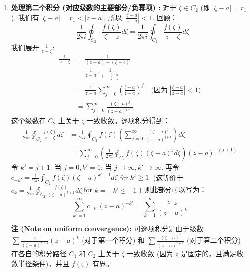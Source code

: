\documentclass[linespread=1.5,openany]{book}%
\def\diff{d}%
\theoremstyle{plain}
\newcommand{\diff}{\mathop{}\!\mathrm{d}}  %
\begin{document}
{{{{{{{{\begin{enumerate}[label=\arabic*)]
											\textbf {注:}可逐项积分是由于级数$\sum_{k=0}^{\infty} \frac{(z-a)^k}{(\zeta-a)^{k+1}}$在 $C_1$ 上关于参数$z$一致收敛.
											
											又 \(f(\zeta)\) 在 $C_1$ 上有界，则$\sum_{k=0}^{\infty} \frac{f(\zeta)(z-a)^k}{(\zeta-a)^{k+1}}$在 $C_1$ 上一致收敛.
											
											
											\item \textbf{处理第二个积分 (对应级数的主要部分/负幂项) :}
											对于 $\zeta \in C_2$ (即 $|\zeta-a|=r_1$), 我们有 $|\zeta-a| = r_1 < |z-a|$.
											所以 $\left|\frac{\zeta-a}{z-a}\right| < 1$.
											回顾：
											\[ -\frac{1}{2\pi i} \oint_{C_2} \frac{f(\zeta)}{\zeta-z} \diff \zeta = \frac{1}{2\pi i} \oint_{C_2} \frac{f(\zeta)}{z-\zeta} \diff \zeta \]
											我们展开 $\frac{1}{z-\zeta}$:
											\begin{align*}
												\frac{1}{z-\zeta} &= \frac{1}{(z-a) - (\zeta-a)} \\
												&= \frac{1}{z-a} \cdot \frac{1}{1 - \frac{\zeta-a}{z-a}} \\
												&= \frac{1}{z-a} \sum_{j=0}^{\infty} \left(\frac{\zeta-a}{z-a}\right)^j \quad \text{(因为 } \left|\frac{\zeta-a}{z-a}\right|<1 \text{)} \\
												&= \sum_{j=0}^{\infty} \frac{(\zeta-a)^j}{(z-a)^{j+1}}
											\end{align*}
											这个级数在 $C_2$ 上关于 $\zeta$ 一致收敛。逐项积分得到：
											\begin{align*}
												\frac{1}{2\pi i} \oint_{C_2} \frac{f(\zeta)}{z-\zeta} \diff \zeta &= \frac{1}{2\pi i} \oint_{C_2} f(\zeta) \left( \sum_{j=0}^{\infty} \frac{(\zeta-a)^j}{(z-a)^{j+1}} \right) \diff \zeta \\
												&= \sum_{j=0}^{\infty} \left( \frac{1}{2\pi i} \oint_{C_2} f(\zeta)(\zeta-a)^j \diff \zeta \right) (z-a)^{-(j+1)}
											\end{align*}
											令 $k' = j+1$. 当 $j=0, k'=1$; 当 $j \to \infty, k' \to \infty$.
											再令 $c_{-k'} = \frac{1}{2\pi i} \oint_{C_2} f(\zeta)(\zeta-a)^{k'-1} \diff \zeta$ for $k' \ge 1$.
											(这等价于 $c_k = \frac{1}{2\pi i} \oint_{C_2} \frac{f(\zeta)}{(\zeta-a)^{k+1}} \diff \zeta$ for $k = -k' \le -1$ )
											则此部分可以写为：
											\[ \sum_{k'=1}^{\infty} c_{-k'} (z-a)^{-k'} = \sum_{k=1}^{\infty} \frac{c_{-k}}{(z-a)^k} \]
											
											
											\textbf{注 (Note on uniform convergence):}
											可逐项积分是由于级数 $\sum \frac{1}{(\zeta-a)^{k+1}}(z-a)^k$ (对于第一个积分) 和 $\sum \frac{(\zeta-a)^j}{(z-a)^{j+1}}$ (对于第二个积分) 在各自的积分路径 $C_1$ 和 $C_2$ 上关于 $\zeta$ 一致收敛 (因为 $z$ 是固定的，且满足收敛半径条件)，并且 $f(\zeta)$ 有界。
											

\end{enumerate}}}}}}}}}
\end{document}
